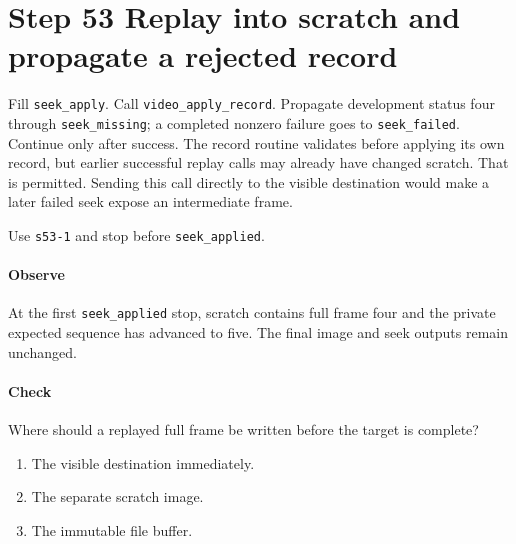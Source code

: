 \section{Step 53 Replay into scratch and propagate a rejected record}
Fill \texttt{seek\_apply}. Call \texttt{video\_apply\_record}. Propagate development status four through \texttt{seek\_missing}; a completed nonzero failure goes to \texttt{seek\_failed}. Continue only after success. The record routine validates before applying its own record, but earlier successful replay calls may already have changed scratch. That is permitted. Sending this call directly to the visible destination would make a later failed seek expose an intermediate frame.

Use \texttt{s53-1} and stop before \texttt{seek\_applied}.

\paragraph{Observe} At the first \texttt{seek\_applied} stop, scratch contains full frame four and the private expected sequence has advanced to five. The final image and seek outputs remain unchanged.

\paragraph{Check} Where should a replayed full frame be written before the target is complete?
\begin{enumerate}[label=\Alph*.]
\item The visible destination immediately.
\item The separate scratch image.
\item The immutable file buffer.
\end{enumerate}
